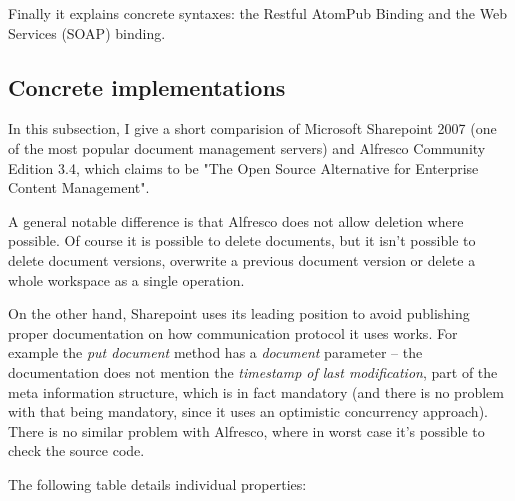Finally it explains concrete syntaxes: the Restful AtomPub Binding and the Web
Services (SOAP) binding.

\subsection{Concrete implementations}

In this subsection, I give a short comparision of Microsoft Sharepoint 2007 (one of
the most popular document management servers) and Alfresco Community Edition 3.4, which claims to be
"The Open Source Alternative for Enterprise Content Management".

A general notable difference is that Alfresco does not allow deletion where
possible. Of course it is possible to delete documents, but it isn't possible
to delete document versions, overwrite a previous document version or delete a
whole workspace as a single operation.

On the other hand, Sharepoint uses its leading position to avoid publishing
proper documentation on how communication protocol it uses works. For example
the \emph{put document} method has a \emph{document} parameter -- the
documentation\cite{spdoc} does not mention the \emph{timestamp of last
modification}, part of the meta information structure, which is in fact
mandatory (and there is no problem with that being mandatory, since it uses an
optimistic concurrency approach). There is no similar problem with Alfresco,
where in worst case it's possible to check the source code.

The following table details individual properties:


